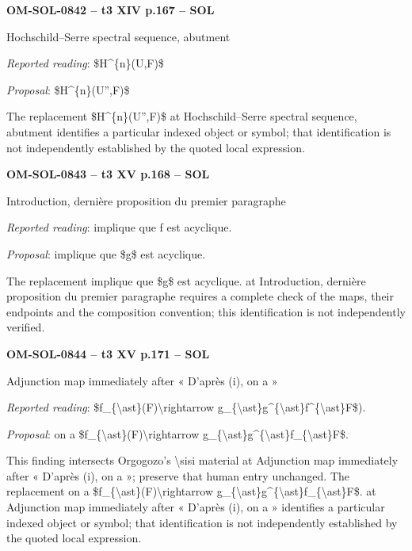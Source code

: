 \par\noindent\textbf{OM-SOL-0842 -- t3 XIV p.167 -- SOL}\par
Hochschild–Serre spectral sequence, abutment\par
\emph{Reported reading}: \$H\textasciicircum{}\{n\}(U,F)\$\par
\emph{Proposal}: \$H\textasciicircum{}\{n\}(U'',F)\$\par
The replacement \$H\textasciicircum{}\{n\}(U'',F)\$ at Hochschild–Serre spectral sequence, abutment identifies a particular indexed object or symbol; that identification is not independently established by the quoted local expression.\par
\par\noindent\textbf{OM-SOL-0843 -- t3 XV p.168 -- SOL}\par
Introduction, dernière proposition du premier paragraphe\par
\emph{Reported reading}: implique que f est acyclique.\par
\emph{Proposal}: implique que \$g\$ est acyclique.\par
The replacement implique que \$g\$ est acyclique. at Introduction, dernière proposition du premier paragraphe requires a complete check of the maps, their endpoints and the composition convention; this identification is not independently verified.\par
\par\noindent\textbf{OM-SOL-0844 -- t3 XV p.171 -- SOL}\par
Adjunction map immediately after « D'après (i), on a »\par
\emph{Reported reading}: \$f\_\{\textbackslash{}ast\}(F)\textbackslash{}rightarrow g\_\{\textbackslash{}ast\}g\textasciicircum{}\{\textbackslash{}ast\}f\textasciicircum{}\{\textbackslash{}ast\}F\$).\par
\emph{Proposal}: on a \$f\_\{\textbackslash{}ast\}(F)\textbackslash{}rightarrow g\_\{\textbackslash{}ast\}g\textasciicircum{}\{\textbackslash{}ast\}f\_\{\textbackslash{}ast\}F\$.\par
This finding intersects Orgogozo's \textbackslash{}sisi material at Adjunction map immediately after « D'après (i), on a »; preserve that human entry unchanged. The replacement on a \$f\_\{\textbackslash{}ast\}(F)\textbackslash{}rightarrow g\_\{\textbackslash{}ast\}g\textasciicircum{}\{\textbackslash{}ast\}f\_\{\textbackslash{}ast\}F\$. at Adjunction map immediately after « D'après (i), on a » identifies a particular indexed object or symbol; that identification is not independently established by the quoted local expression.\par
